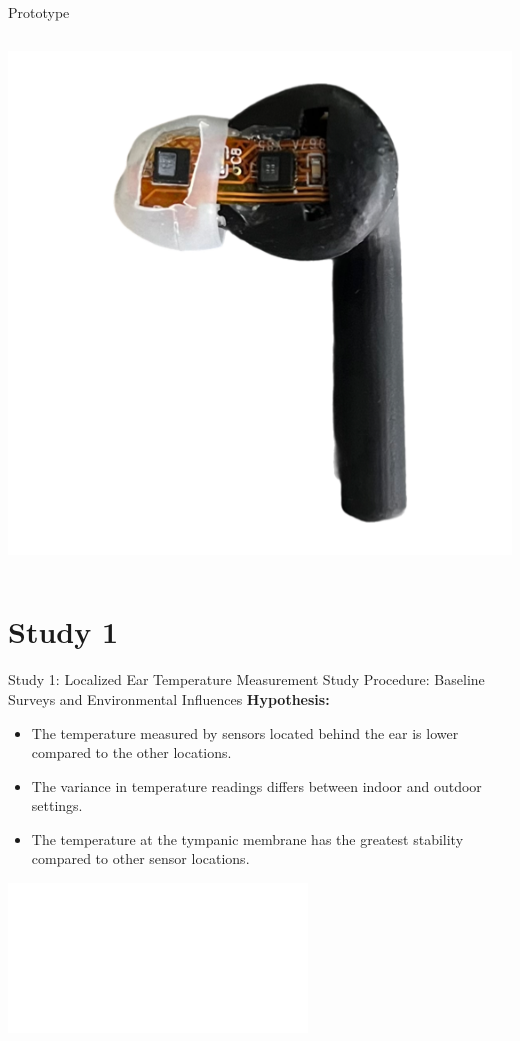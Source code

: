 \documentclass[en]{sdqbeamer}
\begin{document}
\begin{frame}{Prototype}
\begin{columns}[T]
    \begin{column}{.31\textwidth} %
      \includegraphics[width=0.9\linewidth]{../thesis-doc/images/prototype/Earpod_Side2.png} %
    \end{column}
  \end{columns}
\end{frame}

\section{Study 1}
\begin{frame}{Study 1: Localized Ear Temperature Measurement Study Procedure: Baseline Surveys and Environmental Influences}
\textbf{Hypothesis:}
\begin{overprint}
    \begin{itemize}
        \item<1-> The temperature measured by sensors located behind the ear is lower compared to the other locations.
        \item<2-> The variance in temperature readings differs between indoor and outdoor settings.
        \item<3-> The temperature at the tympanic membrane has the greatest stability compared to other sensor locations.
    \end{itemize}
    \end{overprint}
    
    \begin{center}
        \includegraphics<1->[width=0.85\linewidth]{../thesis-doc/images/study1/Procedure_short.pdf} %
    \end{center}
\end{frame}
\end{document}
